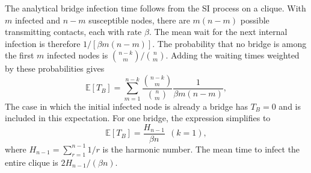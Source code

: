 \documentclass{ieeeaccess}
\newcommand{\yulian}[2]{{\color{red}#1}}
\begin{document}
\yulian{The analytical bridge infection time follows from the SI process on a clique. With $m$ infected and $n-m$ susceptible nodes, there are $m(n-m)$ possible transmitting contacts, each with rate $\beta$. The mean wait for the next internal infection is therefore $1/[\beta m(n-m)]$. The probability that no bridge is among the first $m$ infected nodes is $\binom{n-k}{m}/\binom{n}{m}$. Adding the waiting times weighted by these probabilities gives}{Consider an $n$-node clique with SI dynamics, per-edge rate $\beta$, a uniformly placed seed and a uniformly placed set of $k$ bridge nodes. When $m$ nodes are infected, the next internal infection occurs at rate $\beta m(n-m)$, independently of which nodes are infected, and the infected set is a uniform $m$-subset. The probability that none of the first $m$ infected nodes is a bridge is $\binom{n-k}{m}/\binom{n}{m}$, hence}
\begin{equation}
\label{eq:clique_TB}
\mathbb{E}[T_B]=\sum_{m=1}^{n-k}\frac{\binom{n-k}{m}}{\binom{n}{m}}\frac{1}{\beta m(n-m)},
\end{equation}
\yulian{The case in which the initial infected node is already a bridge has $T_B=0$ and is included in this expectation. For one bridge, the expression simplifies to}{For one bridge this simplifies to}
\begin{equation}
\mathbb{E}[T_B]=\frac{H_{n-1}}{\beta n}\ \ (k=1),
\end{equation}
\yulian{where $H_{n-1}=\sum_{r=1}^{n-1}1/r$ is the harmonic number. The mean time to infect the entire clique is $2H_{n-1}/(\beta n)$.}{}


\EOD
\end{document}
